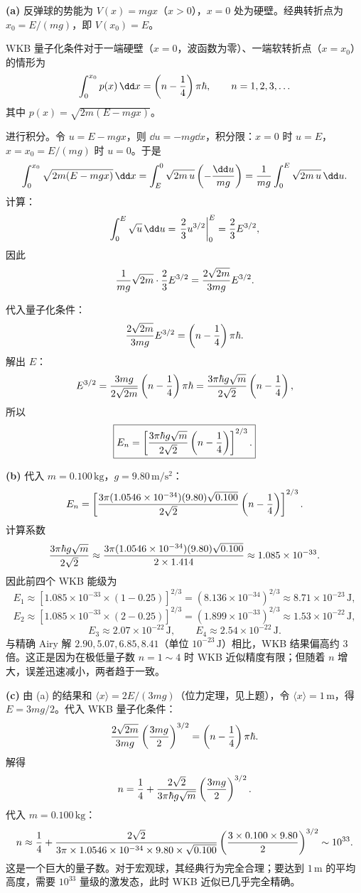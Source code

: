 \begin{solution}
\textbf{(a)} 反弹球的势能为 $V(x)=mgx$（$x>0$），$x=0$ 处为硬壁。经典转折点为 $x_0=E/(mg)$，即 $V(x_0)=E$。

WKB 量子化条件对于一端硬壁（$x=0$，波函数为零）、一端软转折点（$x=x_0$）的情形为
\[
\int_0^{x_0}p(x)\,\dd x=\left(n-{1\over4}\right)\pi\hbar,
\qquad n=1,2,3,\ldots
\]
其中 $p(x)=\sqrt{2m(E-mgx)}$。

进行积分。令 $u=E-mgx$，则 $\dd u=-mg\dd x$，积分限：$x=0$ 时 $u=E$，$x=x_0=E/(mg)$ 时 $u=0$。于是
\[
\int_0^{x_0}\sqrt{2m(E-mgx)}\,\dd x
=\int_E^0\sqrt{2m\,u}\left(-{\dd u\over mg}\right)
={1\over mg}\int_0^E\sqrt{2m\,u}\,\dd u.
\]
计算：
\[
\int_0^E\sqrt{u}\,\dd u=\left.{2\over3}u^{3/2}\right|_0^E={2\over3}E^{3/2},
\]
因此
\[
{1\over mg}\sqrt{2m}\cdot{2\over3}E^{3/2}
={2\sqrt{2m}\over3mg}E^{3/2}.
\]

代入量子化条件：
\[
{2\sqrt{2m}\over3mg}E^{3/2}=\left(n-{1\over4}\right)\pi\hbar.
\]
解出 $E$：
\[
E^{3/2}={3mg\over2\sqrt{2m}}\left(n-{1\over4}\right)\pi\hbar
={3\pi\hbar g\sqrt m\over2\sqrt2}\left(n-{1\over4}\right),
\]
所以
\[
\boxed{E_n=\left[{3\pi\hbar g\sqrt m\over2\sqrt2}\left(n-{1\over4}\right)\right]^{2/3}.}
\]

\textbf{(b)} 代入 $m=0.100\,\mathrm{kg}$，$g=9.80\,\mathrm{m/s^2}$：
\[
E_n=\left[{3\pi(1.0546\times10^{-34})(9.80)\sqrt{0.100}\over2\sqrt2}
\left(n-{1\over4}\right)\right]^{2/3}.
\]
计算系数
\[
{3\pi\hbar g\sqrt m\over2\sqrt2}
\approx{3\pi(1.0546\times10^{-34})(9.80)\sqrt{0.100}\over2\times1.414}
\approx 1.085\times10^{-33}.
\]
因此前四个 WKB 能级为
\[
E_1\approx\left[1.085\times10^{-33}\times(1-0.25)\right]^{2/3}
=\left(8.136\times10^{-34}\right)^{2/3}\approx 8.71\times10^{-23}\,\mathrm{J},
\]
\[
E_2\approx\left[1.085\times10^{-33}\times(2-0.25)\right]^{2/3}
=\left(1.899\times10^{-33}\right)^{2/3}\approx 1.53\times10^{-22}\,\mathrm{J},
\]
\[
E_3\approx 2.07\times10^{-22}\,\mathrm{J},\qquad
E_4\approx 2.54\times10^{-22}\,\mathrm{J}.
\]
与精确 Airy 解 $2.90,5.07,6.85,8.41$（单位 $10^{-23}\,\mathrm{J}$）相比，WKB 结果偏高约 $3$ 倍。这正是因为在极低量子数 $n=1\sim4$ 时 WKB 近似精度有限；但随着 $n$ 增大，误差迅速减小，两者趋于一致。

\textbf{(c)} 由 (a) 的结果和 $\langle x\rangle=2E/(3mg)$（位力定理，见上题），令 $\langle x\rangle=1\,\mathrm{m}$，得 $E=3mg/2$。代入 WKB 量子化条件：
\[
{2\sqrt{2m}\over3mg}\left({3mg\over2}\right)^{3/2}
=\left(n-{1\over4}\right)\pi\hbar.
\]
解得
\[
n={1\over4}+{2\sqrt{2}\over3\pi\hbar g\sqrt m}\left({3mg\over2}\right)^{3/2}.
\]
代入 $m=0.100\,\mathrm{kg}$：
\[
n\approx{1\over4}+{2\sqrt2\over3\pi\times1.0546\times10^{-34}\times9.80\times\sqrt{0.100}}
\left({3\times0.100\times9.80\over2}\right)^{3/2}\sim 10^{33}.
\]
这是一个巨大的量子数。对于宏观球，其经典行为完全合理；要达到 $1\,\mathrm{m}$ 的平均高度，需要 $10^{33}$ 量级的激发态，此时 WKB 近似已几乎完全精确。
\end{solution}

